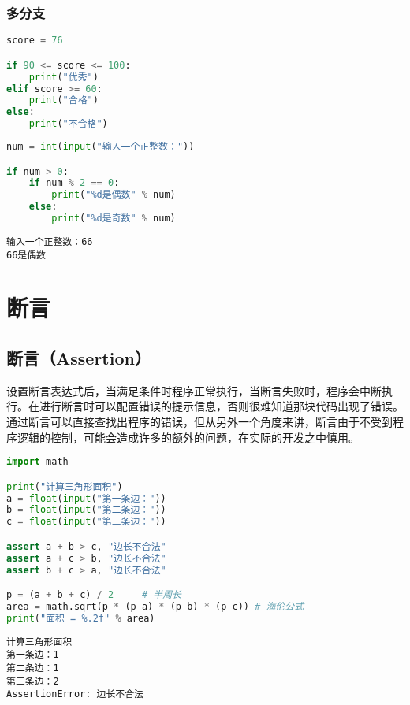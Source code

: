 \subsubsection{多分支}

\vspace{-1cm}

\begin{lstlisting}[language=Python]
score = 76

if 90 <= score <= 100:
    print("优秀")
elif score >= 60:
    print("合格")
else:
    print("不合格")
\end{lstlisting}

\vspace{0.5cm}


\begin{lstlisting}[language=Python]
num = int(input("输入一个正整数："))

if num > 0:
    if num % 2 == 0:
        print("%d是偶数" % num)
    else:
        print("%d是奇数" % num)
\end{lstlisting}

\begin{tcolorbox}
	\begin{verbatim}
输入一个正整数：66
66是偶数
\end{verbatim}
\end{tcolorbox}

\newpage

\section{断言}

\subsection{断言（Assertion）}

设置断言表达式后，当满足条件时程序正常执行，当断言失败时，程序会中断执行。在进行断言时可以配置错误的提示信息，否则很难知道那块代码出现了错误。\\

通过断言可以直接查找出程序的错误，但从另外一个角度来讲，断言由于不受到程序逻辑的控制，可能会造成许多的额外的问题，在实际的开发之中慎用。\\


\begin{lstlisting}[language=Python]
import math

print("计算三角形面积")
a = float(input("第一条边："))
b = float(input("第二条边："))
c = float(input("第三条边："))

assert a + b > c, "边长不合法"
assert a + c > b, "边长不合法"
assert b + c > a, "边长不合法"

p = (a + b + c) / 2     # 半周长
area = math.sqrt(p * (p-a) * (p-b) * (p-c)) # 海伦公式
print("面积 = %.2f" % area)
\end{lstlisting}

\begin{tcolorbox}
	\begin{verbatim}
计算三角形面积
第一条边：1
第二条边：1
第三条边：2
AssertionError: 边长不合法
\end{verbatim}
\end{tcolorbox}

\newpage
